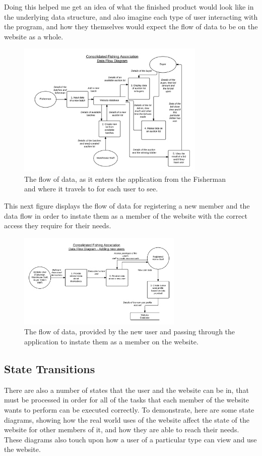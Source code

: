 \documentclass{article}
\begin{document}
Doing this helped me get an idea of what the finished product would look like in the underlying data structure, and also imagine each type of user interacting with the program, and how they themselves would expect the flow of data to be on the website as a whole.
\begin{figure}[H]
	\centering
	\includegraphics[width=0.8\textwidth]{img/TA-DFD-Transaction.png}
	\caption{The flow of data, as it enters the application from the Fisherman and where it travels to for each user to see.}
\end{figure}
This next figure displays the flow of data for registering a new member and the data flow in order to instate them as a member of the website with the correct access they require for their needs.
\begin{figure}[H]
	\centering
	\includegraphics[width=0.7\textwidth]{img/TA-DFD-User.png}
	\caption{The flow of data, provided by the new user and passing through the application to instate them as a member on the website.}
\end{figure}

\subsection{State Transitions}
There are also a number of states that the user and the website can be in, that must be processed in order for all of the tasks that each member of the website wants to perform can be executed correctly. To demonstrate, here are some state diagrams, showing how the real world uses of the website affect the state of the website for other members of it, and how they are able to reach their needs. These diagrams also touch upon how a user of a particular type can view and use the website.
\end{document}
